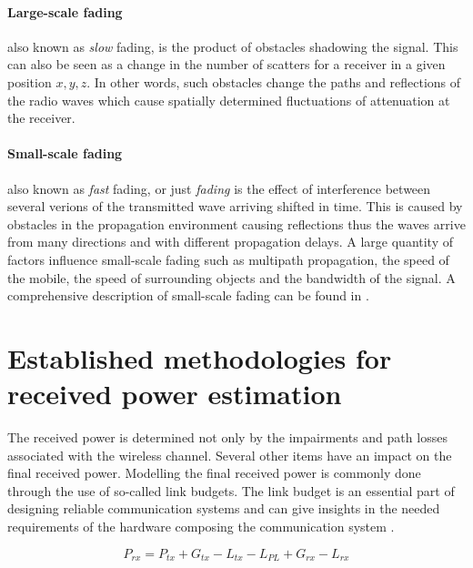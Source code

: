 \paragraph{Large-scale fading}
also known as \emph{slow} fading, is the product of obstacles shadowing the signal. This can also be seen as a change in the number of scatters for a receiver in a given position $x,y,z$. In other words, such obstacles change the paths and reflections of the radio waves which cause spatially determined fluctuations of attenuation at the receiver. 


\paragraph{Small-scale fading}\label{sec:small_scale_fading}
also known as \emph{fast} fading, or just \emph{fading} \cite{Rappaport:2001:WCP:559977} is the effect of interference between several verions of the transmitted wave arriving shifted in time. This is caused by obstacles in the propagation environment causing reflections thus the waves arrive from many directions and with different propagation delays. A large quantity of factors influence small-scale fading such as multipath propagation, the speed of the mobile, the speed of surrounding objects and the bandwidth of the signal. A comprehensive description of small-scale fading can be found in \cite{Rappaport:2001:WCP:559977}. 


\section{Established methodologies for received power estimation}
The received power is determined not only by the impairments and path losses associated with the wireless channel. Several other items have an impact on the final received power. Modelling the final received power is commonly done through the use of so-called link budgets. The link budget is an essential part of designing reliable communication systems and can give insights in the needed requirements of the hardware composing the communication system \cite{Molisch2007}.


\begin{equation}\label{eq:link_budget}
    P_{rx} = P_{tx} + G_{tx} - L_{tx} - L_{PL} + G_{rx} - L_{rx}
\end{equation}

